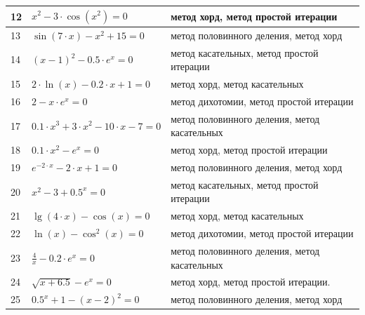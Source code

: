 {\begin{longtable}{|l|l|p{}|}
12 &$x^2-3\cdot \cos (x^2)=0$ &метод хорд, метод простой итерации\\\hline
13 &$\sin (7\cdot x)-x^2+15=0$ &метод половинного деления, метод хорд\\\hline
14 &$(x-1)^2-0.5\cdot e^x=0$ &метод касательных, метод простой итерации\\\hline
15 &$2\cdot \ln (x)-0.2\cdot x+1=0$ &метод хорд, метод касательных\\\hline
16 &$2-x\cdot e^x=0$ &метод дихотомии, метод простой итерации\\\hline
17 &$0.1\cdot x^3+3\cdot x^2-10\cdot x-7=0$ &метод половинного деления, метод касательных\\\hline
18 &$0.1\cdot x^2-e^x=0$ &метод хорд, метод простой итерации\\\hline
19 &$e^{-2\cdot x}-2\cdot x+1=0$ &метод половинного деления, метод хорд\\\hline
20 &$x^2-3+0.5^x=0$ &метод касательных, метод простой итерации\\\hline
21 &$\lg(4\cdot x)-\cos (x)=0$ &метод хорд, метод касательных\\\hline
22 &$\ln(x)-\cos^2(x)=0$ &метод дихотомии, метод простой итерации\\\hline
23 &$\frac{4}{x}-0.2\cdot e^x=0$ &метод половинного деления, метод касательных\\\hline
24 &$\sqrt{x+6.5}-e^x=0$ &метод хорд, метод простой итерации.\\\hline
25 &$0.5^x+1-(x-2)^2=0$ &метод половинного деления, метод хорд\\\hline
\end{longtable}
}





